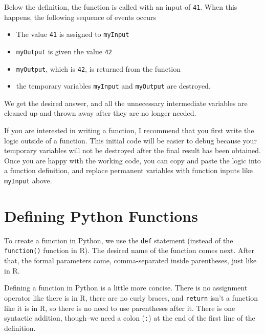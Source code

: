 \documentclass[12pt,krantz2]{krantz}
\providecommand{\tightlist}{%
  \setlength{\itemsep}{0pt}\setlength{\parskip}{0pt}}
\begin{document}
Below the definition, the function is called with an input of \texttt{41}. When this happens, the following sequence of events occurs

\begin{itemize}
\tightlist
\item
  The value \texttt{41} is assigned to \texttt{myInput}
\item
  \texttt{myOutput} is given the value \texttt{42}
\item
  \texttt{myOutput}, which is \texttt{42}, is returned from the function
\item
  the temporary variables \texttt{myInput} and \texttt{myOutput} are destroyed.
\end{itemize}

We get the desired answer, and all the unnecessary intermediate variables are cleaned up and thrown away after they are no longer needed.

\begin{rmd-caution}
If you are interested in writing a function, I recommend that you first write the logic outside of a function. This initial code will be easier to debug because your temporary variables will not be destroyed after the final result has been obtained. Once you are happy with the working code, you can copy and paste the logic into a function definition, and replace permanent variables with function inputs like \texttt{myInput} above.

\end{rmd-caution}

\hypertarget{defining-python-functions}{%
\section{Defining Python Functions}\label{defining-python-functions}}

To create a function in Python, we use the \texttt{def} statement (instead of the \texttt{function()} function in R). The desired name of the function comes next. After that, the formal parameters come, comma-separated inside parentheses, just like in R.

Defining a function in Python is a little more concise. There is no assignment operator like there is in R, there are no curly braces, and \texttt{return} isn't a function like it is in R, so there is no need to use parentheses after it. There is one syntactic addition, though--we need a colon (\texttt{:}) at the end of the first line of the definition.
\end{document}
